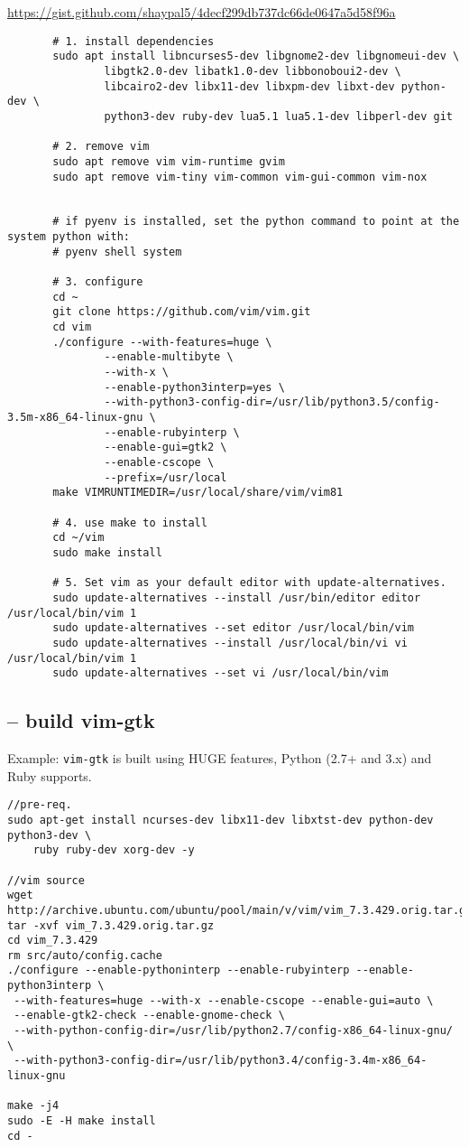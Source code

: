 \url{https://gist.github.com/shaypal5/4decf299db737dc66de0647a5d58f96a}
\begin{verbatim}
       # 1. install dependencies
       sudo apt install libncurses5-dev libgnome2-dev libgnomeui-dev \
               libgtk2.0-dev libatk1.0-dev libbonoboui2-dev \
               libcairo2-dev libx11-dev libxpm-dev libxt-dev python-dev \
               python3-dev ruby-dev lua5.1 lua5.1-dev libperl-dev git

       # 2. remove vim
       sudo apt remove vim vim-runtime gvim
       sudo apt remove vim-tiny vim-common vim-gui-common vim-nox


       # if pyenv is installed, set the python command to point at the system python with:
       # pyenv shell system

       # 3. configure
       cd ~
       git clone https://github.com/vim/vim.git
       cd vim
       ./configure --with-features=huge \
               --enable-multibyte \
               --with-x \
               --enable-python3interp=yes \
               --with-python3-config-dir=/usr/lib/python3.5/config-3.5m-x86_64-linux-gnu \
               --enable-rubyinterp \
               --enable-gui=gtk2 \
               --enable-cscope \
               --prefix=/usr/local
       make VIMRUNTIMEDIR=/usr/local/share/vim/vim81

       # 4. use make to install
       cd ~/vim
       sudo make install

       # 5. Set vim as your default editor with update-alternatives.
       sudo update-alternatives --install /usr/bin/editor editor /usr/local/bin/vim 1
       sudo update-alternatives --set editor /usr/local/bin/vim
       sudo update-alternatives --install /usr/local/bin/vi vi /usr/local/bin/vim 1
       sudo update-alternatives --set vi /usr/local/bin/vim

\end{verbatim}

\subsection{-- build vim-gtk}
\label{sec:vim-Ruby}
\label{sec:vim-gtk-build}
\label{sec:install-vim}

Example: \verb!vim-gtk! is built using HUGE features, Python (2.7+ and
3.x) and Ruby supports.
\begin{verbatim}
//pre-req.
sudo apt-get install ncurses-dev libx11-dev libxtst-dev python-dev python3-dev \ 
    ruby ruby-dev xorg-dev -y

//vim source
wget http://archive.ubuntu.com/ubuntu/pool/main/v/vim/vim_7.3.429.orig.tar.gz
tar -xvf vim_7.3.429.orig.tar.gz
cd vim_7.3.429
rm src/auto/config.cache
./configure --enable-pythoninterp --enable-rubyinterp --enable-python3interp \
 --with-features=huge --with-x --enable-cscope --enable-gui=auto \
 --enable-gtk2-check --enable-gnome-check \
 --with-python-config-dir=/usr/lib/python2.7/config-x86_64-linux-gnu/ \
 --with-python3-config-dir=/usr/lib/python3.4/config-3.4m-x86_64-linux-gnu 
 
make -j4 
sudo -E -H make install 
cd -
\end{verbatim}


